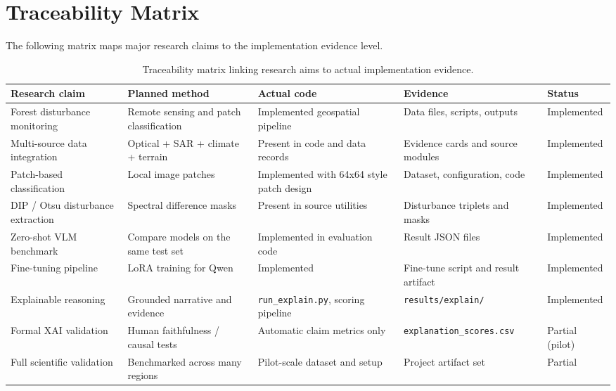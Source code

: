 \documentclass[11pt]{article}
\begin{document}
\section{Traceability Matrix}

The following matrix maps major research claims to the implementation evidence level.

\begin{table}[H]
\centering
\renewcommand{\arraystretch}{1.25}
\small
\begin{tabular}{p{3.5cm} p{3cm} p{3.2cm} p{3.6cm} p{2.3cm}}
\toprule
\textbf{Research claim} & \textbf{Planned method} & \textbf{Actual code} & \textbf{Evidence} & \textbf{Status} \\
\midrule
Forest disturbance monitoring & Remote sensing and patch classification & Implemented geospatial pipeline & Data files, scripts, outputs & Implemented \\
Multi-source data integration & Optical + SAR + climate + terrain & Present in code and data records & Evidence cards and source modules & Implemented \\
Patch-based classification & Local image patches & Implemented with 64x64 style patch design & Dataset, configuration, code & Implemented \\
DIP / Otsu disturbance extraction & Spectral difference masks & Present in source utilities & Disturbance triplets and masks & Implemented \\
Zero-shot VLM benchmark & Compare models on the same test set & Implemented in evaluation code & Result JSON files & Implemented \\
Fine-tuning pipeline & LoRA training for Qwen & Implemented & Fine-tune script and result artifact & Implemented \\
Explainable reasoning & Grounded narrative and evidence & \texttt{run\_explain.py}, scoring pipeline & \texttt{results/explain/} & Implemented \\
Formal XAI validation & Human faithfulness / causal tests & Automatic claim metrics only & \texttt{explanation\_scores.csv} & Partial (pilot) \\
Full scientific validation & Benchmarked across many regions & Pilot-scale dataset and setup & Project artifact set & Partial \\
\bottomrule
\end{tabular}
\caption{Traceability matrix linking research aims to actual implementation evidence.}
\end{table}
\end{document}
